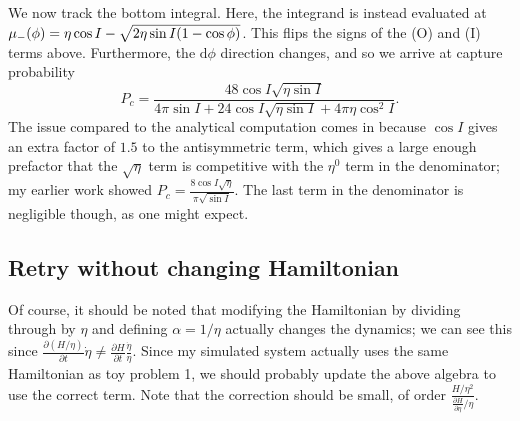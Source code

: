 \documentclass[11pt,
        usenames, %
        dvipsnames %
    ]{article}
\newcommand*{\pd}[2]{\frac{\partial#1}{\partial#2}}
\DeclarePairedDelimiter\p{\lparen}{\rparen}
\begin{document}
We now track the bottom integral. Here, the integrand is instead evaluated at
$\mu_-(\phi) = \eta \cos I - \sqrt{2\eta \sin I\p*{1 - \cos \phi}}$. This flips
the signs of the (O) and (I) terms above. Furthermore, the $\mathrm{d}\phi$
direction changes, and so we arrive at capture probability
\begin{equation}
    P_{c} = \frac{48\cos I \sqrt{\eta \sin I}}{
        4\pi \sin I + 24\cos I \sqrt{\eta \sin I} + 4\pi \eta \cos^2 I}.
\end{equation}
The issue compared to the analytical computation comes in because $\cos I$ gives
an extra factor of $1.5$ to the antisymmetric term, which gives a large enough
prefactor that the $\sqrt{\eta}$ term is competitive with the $\eta^0$ term in
the denominator; my earlier work showed $P_c = \frac{8\cos
I\sqrt{\eta}}{\pi \sqrt{\sin I}}$. The last term in the denominator is
negligible though, as one might expect.

\subsection{Retry without changing Hamiltonian}

Of course, it should be noted that modifying the Hamiltonian by dividing through
by $\eta$ and defining $\alpha = 1/\eta$ actually changes the dynamics; we can
see this since $\pd{(H/\eta)}{t}\dot{\eta} \neq
\pd{H}{t}\frac{\dot{\eta}}{\eta}$. Since my simulated system actually uses the
same Hamiltonian as toy problem 1, we should probably update the above algebra
to use the correct term. Note that the correction should be small, of order
$\frac{H/\eta^2}{\pd{H}{\eta}/\eta}$.
\end{document}
